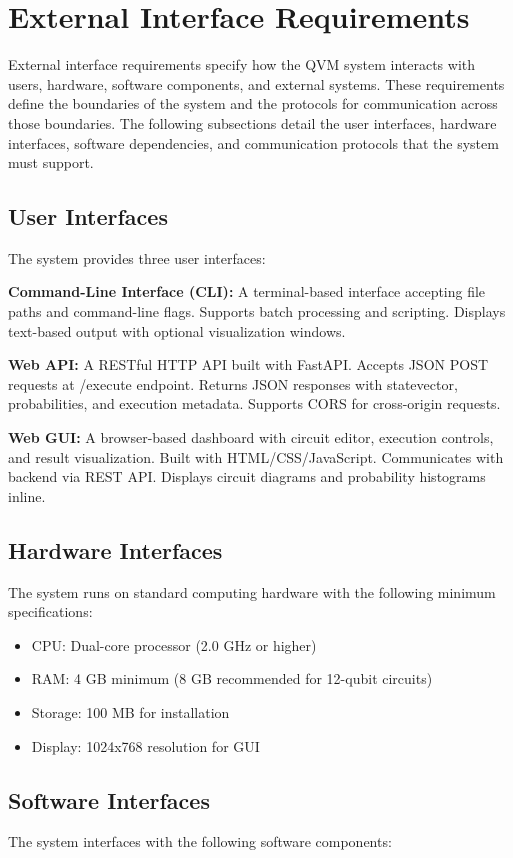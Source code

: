 \section{External Interface Requirements}

External interface requirements specify how the QVM system interacts with users, hardware, software components, and external systems. These requirements define the boundaries of the system and the protocols for communication across those boundaries. The following subsections detail the user interfaces, hardware interfaces, software dependencies, and communication protocols that the system must support.

\subsection{User Interfaces}
The system provides three user interfaces:

\textbf{Command-Line Interface (CLI):} A terminal-based interface accepting file paths and command-line flags. Supports batch processing and scripting. Displays text-based output with optional visualization windows.

\textbf{Web API:} A RESTful HTTP API built with FastAPI. Accepts JSON POST requests at /execute endpoint. Returns JSON responses with statevector, probabilities, and execution metadata. Supports CORS for cross-origin requests.

\textbf{Web GUI:} A browser-based dashboard with circuit editor, execution controls, and result visualization. Built with HTML/CSS/JavaScript. Communicates with backend via REST API. Displays circuit diagrams and probability histograms inline.

\subsection{Hardware Interfaces}
The system runs on standard computing hardware with the following minimum specifications:
\begin{itemize}
\item CPU: Dual-core processor (2.0 GHz or higher)
\item RAM: 4 GB minimum (8 GB recommended for 12-qubit circuits)
\item Storage: 100 MB for installation
\item Display: 1024x768 resolution for GUI
\end{itemize}

\subsection{Software Interfaces}
The system interfaces with the following software components:


